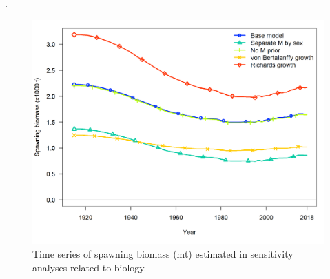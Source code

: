 \documentclass[12pt,]{article}
\begin{document}
\begin{minipage}{\linewidth}%
\label{fig:Sensitivity_sel_and_Q}%
\begin{centering}.
\end{centering}
\end{minipage}

\FloatBarrier

\begin{figure}
\centering
\includegraphics{Figures/sens.bio_compare1_spawnbio.png}
\caption{Time series of spawning biomass (mt) estimated in sensitivity
analyses related to biology. \label{fig:Sensitivity_bio}}
\end{figure}
\end{document}
